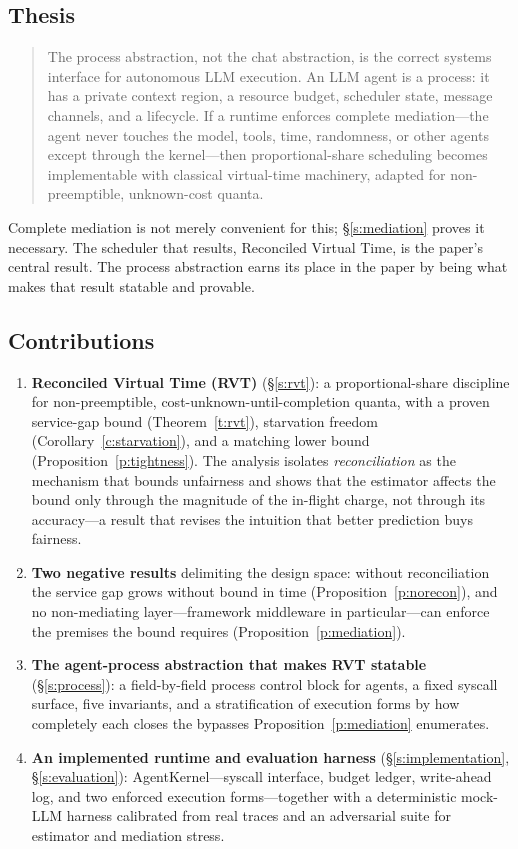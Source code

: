 \documentclass[letterpaper,11pt,leqno]{article}
\begin{document}
\subsection{Thesis}\label{s:thesis}

\begin{quote}
The process abstraction, not the chat abstraction, is the correct systems interface for autonomous LLM execution. An LLM agent is a process: it has a private context region, a resource budget, scheduler state, message channels, and a lifecycle. If a runtime enforces complete mediation---the agent never touches the model, tools, time, randomness, or other agents except through the kernel---then proportional-share scheduling becomes implementable with classical virtual-time machinery, adapted for non-preemptible, unknown-cost quanta.
\end{quote}

Complete mediation is not merely convenient for this; \S\ref{s:mediation} proves it necessary. The scheduler that results, Reconciled Virtual Time, is the paper's central result. The process abstraction earns its place in the paper by being what makes that result statable and provable.

\subsection{Contributions}\label{s:contributions}

\begin{enumerate}
\item \textbf{Reconciled Virtual Time (RVT)} (\S\ref{s:rvt}): a proportional-share discipline for non-preemptible, cost-unknown-until-completion quanta, with a proven service-gap bound (Theorem~\ref{t:rvt}), starvation freedom (Corollary~\ref{c:starvation}), and a matching lower bound (Proposition~\ref{p:tightness}). The analysis isolates \emph{reconciliation} as the mechanism that bounds unfairness and shows that the estimator affects the bound only through the magnitude of the in-flight charge, not through its accuracy---a result that revises the intuition that better prediction buys fairness.
\item \textbf{Two negative results} delimiting the design space: without reconciliation the service gap grows without bound in time (Proposition~\ref{p:norecon}), and no non-mediating layer---framework middleware in particular---can enforce the premises the bound requires (Proposition~\ref{p:mediation}).
\item \textbf{The agent-process abstraction that makes RVT statable} (\S\ref{s:process}): a field-by-field process control block for agents, a fixed syscall surface, five invariants, and a stratification of execution forms by how completely each closes the bypasses Proposition~\ref{p:mediation} enumerates.
\item \textbf{An implemented runtime and evaluation harness} (\S\ref{s:implementation}, \S\ref{s:evaluation}): AgentKernel---syscall interface, budget ledger, write-ahead log, and two enforced execution forms---together with a deterministic mock-LLM harness calibrated from real traces and an adversarial suite for estimator and mediation stress.
\end{enumerate}
\end{document}
